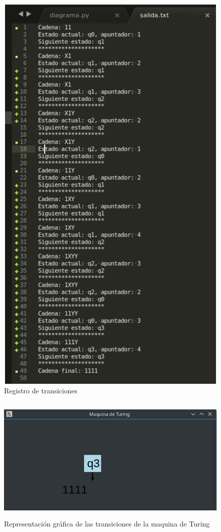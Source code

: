\documentclass[a4paper,12pt]{article}
\begin{document}
\begin{figure}[H]
\begin{center}
 \includegraphics[width=13cm, height=20cm]{dos_historial.png}
 \caption{Registro de transiciones}
 \label{fig:dos_historial}
\end{center}
\end{figure}

\begin{figure}[H]
\begin{center}
 \includegraphics[width=13cm, height=6cm]{dos_grafica.png}
 \caption{Representación gráfica de las transiciones de la maquina de Turing}
 \label{fig:dos_grafica}
\end{center}
\end{figure}

\nocite{LIBRO}



\end{document}
